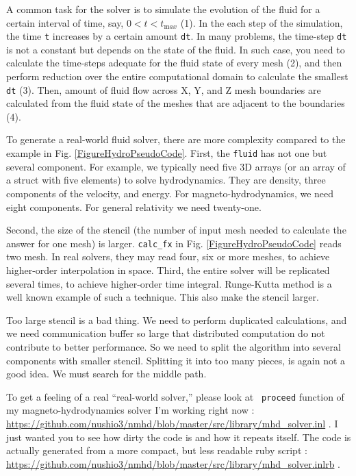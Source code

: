 \documentclass[twocolumn]{article}
\begin{document}
A common task for the solver is to simulate the evolution of the fluid for a
certain interval of time, say, $0 < t < t_{\mathrm max}$ (1). In the each step
of the simulation, the time {\tt t} increases by a certain amount {\tt dt}.
In many problems, the time-step {\tt dt} is not a constant but depends on the
state of the fluid. In such case, you need to calculate the time-steps adequate
for the fluid state of every mesh (2), and then perform reduction over the
entire computational domain to calculate the smallest {\tt dt} (3). Then,
amount of fluid flow across X, Y, and Z mesh boundaries are calculated from
the fluid state of the meshes that are adjacent to the boundaries (4). 

To generate a real-world fluid solver, there are more complexity compared to
the example in Fig. \ref{FigureHydroPseudoCode}. First, the {\tt fluid} has
not one but several component. For example, we typically need five 3D arrays
(or an array of a struct with five elements) to solve hydrodynamics. They are
density, three components of the velocity, and energy. For
magneto-hydrodynamics, we need eight components. For general relativity we
need twenty-one.

Second, the size of the stencil (the number of input mesh needed to calculate
the answer for one mesh) is larger. {\tt calc\_fx} in
Fig. \ref{FigureHydroPseudoCode} reads two mesh. In real solvers, they may
read four, six or more meshes, to achieve higher-order interpolation in space.
Third, the entire solver will be replicated several times, to achieve
higher-order time integral. Runge-Kutta method is a well known example of such
a technique. This also make the stencil larger.

Too large stencil is a bad thing. We need to perform duplicated calculations,
and we need communication buffer so large that distributed computation do not
contribute to better performance. So we need to split the algorithm into
several components with smaller stencil. Splitting it into too many pieces, is
again not a good idea. We must search for the middle path.

To get a feeling of a real ``real-world solver,'' please look at {\tt
  proceed} function of my magneto-hydrodynamics solver I'm working
right now :
\url{https://github.com/nushio3/nmhd/blob/master/src/library/mhd_solver.inl}
. I just wanted you to see how dirty the code is and how it repeats
itself. The code is actually generated from a more compact, but less
readable ruby script :
\url{https://github.com/nushio3/nmhd/blob/master/src/library/mhd_solver.inlrb}
.
\end{document}
